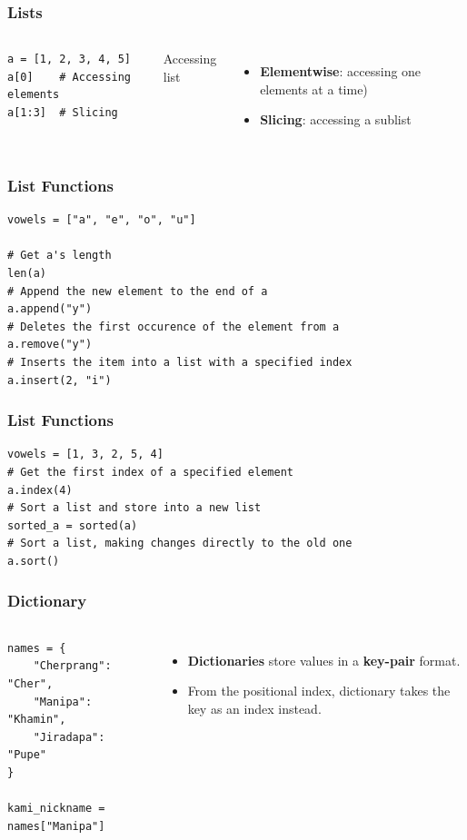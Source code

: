 \documentclass[aspectratio=169]{beamer}
\begin{document}
\begin{frame}[fragile]
    \frametitle{Lists}
    \begin{columns}
            \begin{lstlisting}[style=defaultstyle]
a = [1, 2, 3, 4, 5]
a[0]    # Accessing elements
a[1:3]  # Slicing
\end{lstlisting}
         Accessing list
            \begin{itemize}[<+(2)->]
                \item \textbf{Elementwise}: accessing one elements at a time)
                \item \textbf{Slicing}: accessing a sublist
            \end{itemize}
    \end{columns}
\end{frame}

\begin{frame}[fragile]
    \frametitle{List Functions}
    \begin{lstlisting}[style=defaultstyle]
vowels = ["a", "e", "o", "u"]

# Get a's length
len(a)
# Append the new element to the end of a
a.append("y")
# Deletes the first occurence of the element from a
a.remove("y")
# Inserts the item into a list with a specified index
a.insert(2, "i")\end{lstlisting}
\end{frame}

\begin{frame}[fragile]
    \frametitle{List Functions}
    \begin{lstlisting}[style=defaultstyle]
vowels = [1, 3, 2, 5, 4]
# Get the first index of a specified element
a.index(4)
# Sort a list and store into a new list
sorted_a = sorted(a)
# Sort a list, making changes directly to the old one
a.sort()\end{lstlisting}
\end{frame}

\begin{frame}[fragile]
    \frametitle{Dictionary}
    \begin{columns}
            \begin{lstlisting}[style=defaultstyle]
names = {
    "Cherprang": "Cher",
    "Manipa": "Khamin",
    "Jiradapa": "Pupe"
}

kami_nickname = names["Manipa"]\end{lstlisting}
            \begin{itemize}[<+(1)->]
                \item \textbf{Dictionaries} store values in a \textbf{key-pair} format.
                \item From the positional index, dictionary takes the key as an index instead.
            \end{itemize}
    \end{columns}
\end{frame}
\end{document}
